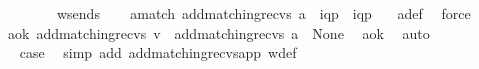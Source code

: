 \begin{isabellebody}
\ \ \ \ \ \ \ \ w{\isacharunderscore}{\kern0pt}sends{\isacharunderscore}{\kern0pt}{}{\isacharparenright}{\kern0pt}\isanewline
\ \ \isamarkupfalse%
\ a{\isacharunderscore}{\kern0pt}match{\isacharcolon}{\kern0pt}\ {\isachardoublequoteopen}{\isacharparenleft}{\kern0pt}add{\isacharunderscore}{\kern0pt}matching{\isacharunderscore}{\kern0pt}recvs\ {\isacharbrackleft}{\kern0pt}a{\isacharbrackright}{\kern0pt}{\isacharparenright}{\kern0pt}\ {\isacharequal}{\kern0pt}\ {\isacharparenleft}{\kern0pt}{\isacharbrackleft}{\kern0pt}{\isacharbang}{\kern0pt}{\isasymlangle}{\isacharparenleft}{\kern0pt}i\isactrlbsup q{\isasymrightarrow}p\isactrlesup {\isacharparenright}{\kern0pt}{\isasymrangle}{\isacharbrackright}{\kern0pt}\ {\isasymsqdot}\ {\isacharbrackleft}{\kern0pt}{\isacharquery}{\kern0pt}{\isasymlangle}{\isacharparenleft}{\kern0pt}i\isactrlbsup q{\isasymrightarrow}p\isactrlesup {\isacharparenright}{\kern0pt}{\isasymrangle}{\isacharbrackright}{\kern0pt}{\isacharparenright}{\kern0pt}{\isachardoublequoteclose}\ \ \isamarkupfalse%
\ a{\isacharunderscore}{\kern0pt}def\ \isamarkupfalse%
\ force\isanewline
\ \ \isamarkupfalse%
\ \isamarkupfalse%
\ a{\isacharunderscore}{\kern0pt}ok{\isacharcolon}{\kern0pt}\ {\isachardoublequoteopen}{\isacharparenleft}{\kern0pt}{\isacharparenleft}{\kern0pt}add{\isacharunderscore}{\kern0pt}matching{\isacharunderscore}{\kern0pt}recvs\ v{\isacharparenright}{\kern0pt}\ {\isasymsqdot}\ {\isacharparenleft}{\kern0pt}add{\isacharunderscore}{\kern0pt}matching{\isacharunderscore}{\kern0pt}recvs\ {\isacharbrackleft}{\kern0pt}a{\isacharbrackright}{\kern0pt}{\isacharparenright}{\kern0pt}{\isacharparenright}{\kern0pt}\ {\isasymin}\ {\isasymT}\isactrlbsub None\isactrlesub {\isachardoublequoteclose}\ \isamarkupfalse%
\ a{\isacharunderscore}{\kern0pt}ok{}\ \isamarkupfalse%
\ auto\isanewline
\ \ \ \ \ \ \isanewline
\ \ \isamarkupfalse%
\ \isamarkupfalse%
\ {\isacharquery}{\kern0pt}case\ \isamarkupfalse%
\ {\isacharparenleft}{\kern0pt}simp\ add{\isacharcolon}{\kern0pt}\ add{\isacharunderscore}{\kern0pt}matching{\isacharunderscore}{\kern0pt}recvs{\isacharunderscore}{\kern0pt}app\ w{\isacharunderscore}{\kern0pt}def{\isacharparenright}{\kern0pt}\ \isanewline
{}\isamarkupfalse%
%
\endisatagproof
{\isafoldproof}%
%
\isadelimproof
\isanewline
%
\endisadelimproof
\isanewline
\isanewline
\isanewline
\isanewline
\isanewline
\isanewline
\isanewline

\end{isabellebody}
